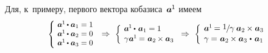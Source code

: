 \begin{otherlanguage}{russian}
Для, к~примеру, первого вектора кобазиса~${\bm{a}^{\hspace{-0.1ex}1}\hspace{-0.1ex}}$ имеем
\vspace{0.2em}\[
\scalebox{0.9}[0.9]{$\left\{\hspace{-0.16em}\begin{array}{l}
\bm{a}^{\hspace{-0.1ex}1} \hspace{-0.1ex} \dotp \bm{a}_{1} = 1 \\
\bm{a}^{\hspace{-0.1ex}1} \hspace{-0.1ex} \dotp \bm{a}_{2} = 0 \\
\bm{a}^{\hspace{-0.1ex}1} \hspace{-0.1ex} \dotp \bm{a}_{3} = 0 \\[0.05em]
\end{array}\right.$} \,\Rightarrow\hspace{0.32em}
%
\scalebox{0.92}[0.92]{$\left\{\hspace{-0.12em}\begin{array}{l}
\bm{a}^{\hspace{-0.1ex}1} \hspace{-0.1ex} \dotp \hspace{0.2ex} \bm{a}_{1} = 1 \\[0.1em]
\gamma \hspace{0.1ex} \bm{a}^{\hspace{-0.1ex}1} \hspace{-0.1ex} = \hspace{0.1ex} \bm{a}_2 \hspace{-0.1ex} \times \bm{a}_3 \\[0.08em]
\end{array}\right.$} \Rightarrow\hspace{0.32em}
%
\scalebox{0.96}[0.96]{$\left\{\hspace{-0.11em}\begin{array}{l}
\bm{a}^{\hspace{-0.1ex}1} \hspace{-0.2ex} =
\displaystyle \nicefrac{\scalebox{0.95}{$1$}\hspace{0.1ex}}{\scalebox{1.02}{$\gamma$}} \hspace{0.5ex} \bm{a}_2 \hspace{-0.1ex} \times \bm{a}_3 \hspace{0.1ex} \\[0.08em]
\gamma = \hspace{0.1ex} \bm{a}_2 \hspace{-0.1ex} \times \bm{a}_3 \hspace{0.1ex} \dotp \hspace{0.25ex} \bm{a}_{1} \\[0.08em]
\end{array}\right.$}
\]


\end{otherlanguage}
